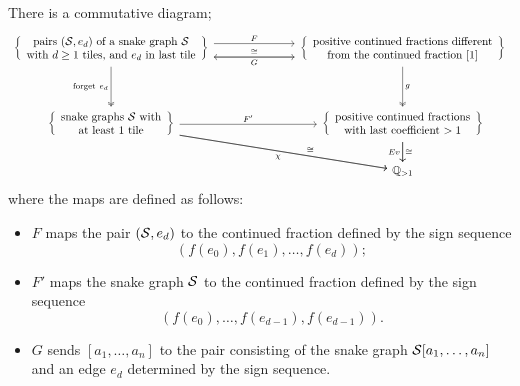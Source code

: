 \begin{theorem}\label{thm3.7}
    There is a commutative diagram;
\[\begin{tikzcd}
	\left\{\begin{array}{c}
\text{pairs $(\s,e_d)$ of a snake graph $\s$} \\ \text{with $d \geq 1$ tiles, and $e_d$ in last tile}
\end{array}\right\} &&& \left\{\begin{array}{c}
\text{positive continued fractions different} \\ \text{from the continued fraction $[1]$}
\end{array}\right\} \\
	\\
	\left\{\begin{array}{c}
\text{snake graphs $\s$ with} \\ \text{at least $1$ tile}
\end{array}\right\} &&& \left\{\begin{array}{c}
\text{positive continued fractions} \\ \text{with last coefficient $>1$}
\end{array}\right\} \\
	&&& \mathbb{Q}_{>1}
	\arrow["\chi"', from=3-1, to=4-4]
	\arrow["{\text{forget} \ e_d}"', two heads, from=1-1, to=3-1]
	\arrow["g", two heads, from=1-4, to=3-4]
	\arrow["{F'}", from=3-1, to=3-4]
	\arrow["Ev"', from=3-4, to=4-4]
	\arrow["G"', shift right=3, from=1-1, to=1-4]
	\arrow["F", shift left=2, from=1-1, to=1-4]
	\arrow["\cong"{pos=0.6}, from=3-1, to=4-4]
	\arrow["\cong"', shift left=3, from=1-4, to=1-1]
	\arrow["\cong", from=3-4, to=4-4]
\end{tikzcd}\]
where the maps are defined as follows:
\begin{itemize}
    \item $F$ maps the pair $(\mathcal{S},e_d)$ to the continued fraction defined by the sign sequence 
    \begin{equation*}
        (f(e_0), f(e_1), \dots, f(e_d));
    \end{equation*} 
    \item $F'$ maps the snake graph $\mathcal{S}$ to the continued fraction defined by the sign sequence 
    \begin{equation*}
        (f(e_0),\dots,f(e_{d-1}),f(e_{d-1})).
    \end{equation*} 
    \item $G$ sends $[a_1,\dots,a_n]$ to the pair consisting of the snake graph $\mathcal{S}[a_1,\dots,a_n]$ and an edge $e_d$ determined by the sign sequence. 

\end{itemize}
\end{theorem}

